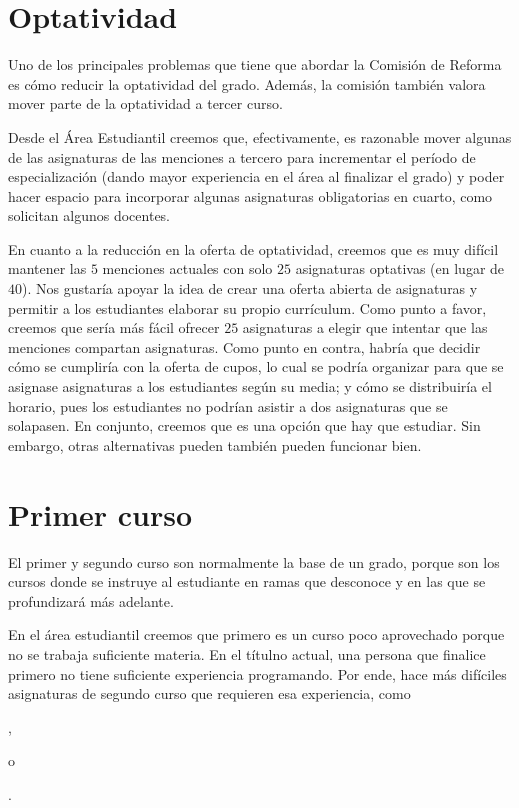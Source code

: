 
\section{Optatividad}

Uno de los principales problemas que tiene que abordar
la Comisión de Reforma
es cómo reducir la optatividad del grado. %
Además, la comisión también valora mover parte de la optatividad a tercer curso.

Desde el Área Estudiantil creemos que, efectivamente,
es razonable mover algunas de las asignaturas de las menciones a tercero para
incrementar el período de especialización
(dando mayor experiencia en el área al finalizar el grado)
y poder hacer espacio para
incorporar algunas asignaturas obligatorias en cuarto,
como solicitan algunos docentes.

En cuanto a la reducción en la oferta de optatividad,
creemos que es muy difícil mantener las $5$ menciones actuales
con solo $25$ asignaturas optativas (en lugar de $40$).
Nos gustaría apoyar la idea de crear una oferta abierta de asignaturas
y permitir a los estudiantes elaborar su propio currículum.
Como punto a favor, creemos que
sería más fácil ofrecer $25$ asignaturas a elegir
que intentar que las menciones compartan asignaturas.
Como punto en contra, habría que decidir
cómo se cumpliría con la oferta de cupos,
lo cual se podría organizar para que
se asignase asignaturas a los estudiantes según su media;
y cómo se distribuiría el horario,
pues los estudiantes no podrían asistir a dos asignaturas que se solapasen.
En conjunto, creemos que es una opción que hay que estudiar.
Sin embargo, otras alternativas pueden también pueden funcionar bien.

\section{Primer curso}\label{sec:approach-first-course}

El primer y segundo curso son normalmente la base de un grado,
porque son los cursos donde se instruye al estudiante en ramas que desconoce y
en las que se profundizará más adelante.

En el área estudiantil creemos que primero es un curso poco aprovechado
porque no se trabaja suficiente materia.
En el títulno actual, una persona que finalice primero
no tiene suficiente experiencia programando.
Por ende, hace más difíciles asignaturas de segundo curso
que requieren esa experiencia, como
\subject{Algoritmos y Estructuras de Datos},
\subject{Programación Orientada a Objetos} o
\subject{Programación Concurrente y Distribuida}.

